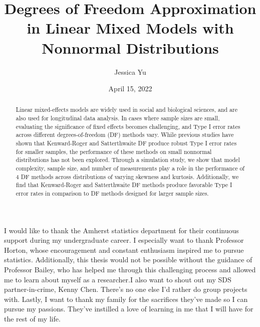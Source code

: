 \documentclass[12pt, twoside]{amherstthesis}
\title{Degrees of Freedom Approximation in Linear Mixed Models with Nonnormal Distributions}
\author{Jessica Yu}
\date{April 15, 2022}
\begin{document}
\doublespace
  \maketitle

\frontmatter %
\pagestyle{fancyplain}

  \begin{abstract}
    Linear mixed-effects models are widely used in social and biological sciences, and are also used for longitudinal data analysis. In cases where sample sizes are small, evaluating the significance of fixed effects becomes challenging, and Type I error rates across different degrees-of-freedom (DF) methods vary. While previous studies have shown that Kenward-Roger and Satterthwaite DF produce robust Type I error rates for smaller samples, the performance of these methods on small nonnormal distributions has not been explored. Through a simulation study, we show that model complexity, sample size, and number of measurements play a role in the performance of 4 DF methods across distributions of varying skewness and kurtosis. Additionally, we find that Kenward-Roger and Satterthwaite DF methods produce favorable Type I error rates in comparison to DF methods designed for larger sample sizes.
  \end{abstract}
  \begin{acknowledgments}
    I would like to thank the Amherst statistics department for their continuous support during my undergraduate career. I especially want to thank Professor Horton, whose encouragement and constant enthusiasm inspired me to pursue statistics. Additionally, this thesis would not be possible without the guidance of Professor Bailey, who has helped me through this challenging process and allowed me to learn about myself as a researcher.I also want to shout out my SDS partner-in-crime, Kenny Chen. There's no one else I'd rather do group projects with.
    Lastly, I want to thank my family for the sacrifices they've made so I can pursue my passions. They've instilled a love of learning in me that I will have for the rest of my life.
  \end{acknowledgments}

  \hypersetup{linkcolor=black}
  \setcounter{tocdepth}{2}
  \tableofcontents

  \listoftables
\end{document}

